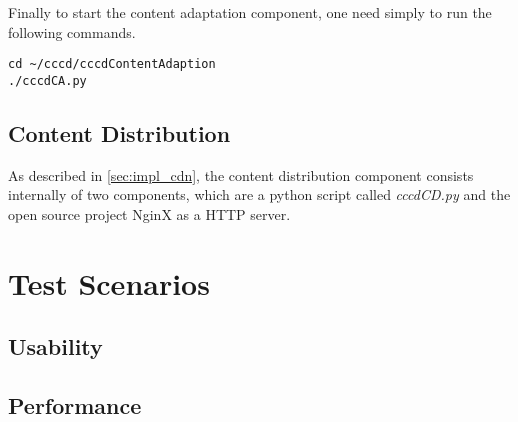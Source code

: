 Finally to start the content adaptation component, one need simply to run the following commands.

\begin{code}
\begin{verbatim}
cd ~/cccd/cccdContentAdaption
./cccdCA.py
\end{verbatim}
\end{code}

\subsection{Content Distribution\label{sec:eval_te_cd}}
As described in \ref{sec:impl_cdn}, the content distribution component consists internally of two components, which are a python script called \textit{cccdCD.py} and the open source project NginX as a \ac{HTTP} server.
\section{Test Scenarios\label{sec:eval__te_sc}}
	\subsection{Usability\label{seq:eval_usab}}
	
	\subsection{Performance\label{seq:eval_perf}}